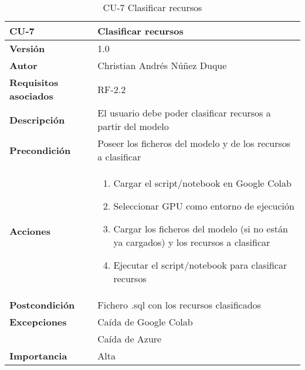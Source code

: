 \begin{table}[p]
	\centering
	\begin{tabularx}{\linewidth}{ p{} p{} }
		\toprule
		\textbf{CU-7}    & \textbf{Clasificar recursos}\\
		\toprule
		\textbf{Versión}              & 1.0    \\
		\textbf{Autor}                & Christian Andrés Núñez Duque \\
		\textbf{Requisitos asociados} & RF-2.2 \\
		\textbf{Descripción}          & El usuario debe poder clasificar recursos a partir del modelo \\
		\textbf{Precondición}         & Poseer los ficheros del modelo y de los recursos a clasificar \\
		\textbf{Acciones}             &
		\begin{enumerate}
			\def\labelenumi{\arabic{enumi}.}
			\tightlist
			\item Cargar el script/notebook en Google Colab
			\item Seleccionar GPU como entorno de ejecución
			\item Cargar los ficheros del modelo (si no están ya cargados) y los recursos a clasificar
			\item Ejecutar el script/notebook para clasificar recursos
		\end{enumerate}\\
		\textbf{Postcondición}        & Fichero .sql con los recursos clasificados \\
		\textbf{Excepciones}          & Caída de Google Colab \\ & Caída de Azure \\
		\textbf{Importancia}          & Alta \\
		\bottomrule
	\end{tabularx}
	\caption{CU-7 Clasificar recursos}
\end{table}

